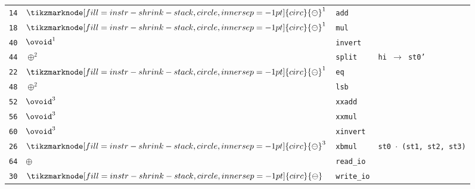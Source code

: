 \documentclass{article}
\newcommand{\shrinkstack}[1]{\tikzmarknode[fill=instr-shrink-stack,circle,inner sep=-1pt]{circ}{#1}}
\newcommand{\hintsplit}{
    \textcolor{hint}{\texttt{hi $\rightarrow$ st0'}}
}
\newcommand{\hintxbmul}{
    \textcolor{hint}{\texttt{st0 $\cdot$ (st1, st2, st3)}}
}
\newcommand{\ssominus}{
    \shrinkstack{\ensuremath{\ominus}}
}
\begin{document}
\begin{minipage}{0.3\textwidth}
\begin{tabular}{rlll}
    \texttt{14} & $\ssominus^1$ & \texttt{add}                                       &                \\
    \texttt{18} & $\ssominus^1$ & \texttt{mul}                                       &                \\
    \texttt{40} & $\ovoid^1$    & \texttt{invert}                                    &                \\
    \texttt{44} & $\oplus^2$    & \texttt{split}                                     & \hintsplit     \\
    \texttt{22} & $\ssominus^1$ & \texttt{eq}                                        &                \\
    \texttt{48} & $\oplus^2$    & \texttt{lsb}                                       &                \\
    \texttt{52} & $\ovoid^3$    & \texttt{xxadd}                                     &                \\
    \texttt{56} & $\ovoid^3$    & \texttt{xxmul}                                     &                \\
    \texttt{60} & $\ovoid^3$    & \texttt{xinvert}                                   &                \\
    \texttt{26} & $\ssominus^3$ & \texttt{xbmul}                                     & \hintxbmul     \\
    \texttt{64} & $\oplus$      & \texttt{read\_io}                                  &                \\
    \texttt{30} & $\ssominus$   & \texttt{write\_io}                                 &
\end{tabular}
\end{minipage}\hfill%
\end{document}
